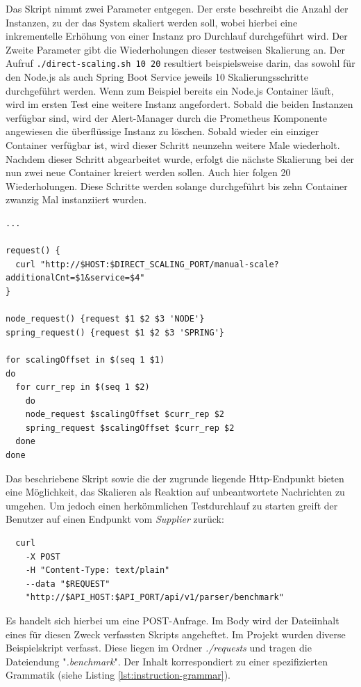 Das Skript nimmt zwei Parameter entgegen. Der erste beschreibt die Anzahl der Instanzen, zu der das System skaliert werden soll, wobei hierbei eine inkrementelle Erhöhung von einer Instanz pro Durchlauf durchgeführt wird. Der Zweite Parameter gibt die Wiederholungen dieser testweisen Skalierung an. Der Aufruf \verb+./direct-scaling.sh 10 20+ resultiert beispielsweise darin, das sowohl für den Node.js als auch Spring Boot Service jeweils 10 Skalierungsschritte durchgeführt werden. Wenn zum Beispiel bereits ein Node.js Container läuft, wird im ersten Test eine weitere Instanz angefordert. Sobald die beiden Instanzen verfügbar sind, wird der Alert-Manager durch die Prometheus Komponente angewiesen die überflüssige Instanz zu löschen. Sobald wieder ein einziger Container verfügbar ist, wird dieser Schritt neunzehn weitere Male wiederholt. Nachdem dieser Schritt abgearbeitet wurde, erfolgt die nächste Skalierung bei der nun zwei neue Container kreiert werden sollen. Auch hier folgen 20 Wiederholungen. Diese Schritte werden solange durchgeführt bis zehn Container zwanzig Mal instanziiert wurden. 

\label{lst:direct-scaling}
\begin{lstlisting}[caption={direct-scaling},style=bashStyle]
...

request() {
  curl "http://$HOST:$DIRECT_SCALING_PORT/manual-scale?additionalCnt=$1&service=$4"
}

node_request() {request $1 $2 $3 'NODE'}
spring_request() {request $1 $2 $3 'SPRING'}

for scalingOffset in $(seq 1 $1)
do 
  for curr_rep in $(seq 1 $2)
	do 
    node_request $scalingOffset $curr_rep $2
    spring_request $scalingOffset $curr_rep $2
  done
done
\end{lstlisting}

Das beschriebene Skript sowie die der zugrunde liegende Http-Endpunkt bieten eine Möglichkeit, das Skalieren als Reaktion auf unbeantwortete Nachrichten zu umgehen. Um jedoch einen herkömmlichen Testdurchlauf zu starten greift der Benutzer auf einen Endpunkt vom \emph{Supplier} zurück: 

\begin{verbatim}
  curl 
    -X POST 
    -H "Content-Type: text/plain" 
    --data "$REQUEST" 
    "http://$API_HOST:$API_PORT/api/v1/parser/benchmark"
\end{verbatim}

Es handelt sich hierbei um eine POST-Anfrage. Im Body wird der Dateiinhalt eines für diesen Zweck verfassten Skripts angeheftet. Im Projekt wurden diverse Beispielskript verfasst. Diese liegen im Ordner \emph{./requests} und tragen die Dateiendung "\emph{.benchmark}". Der Inhalt korrespondiert zu einer spezifizierten Grammatik (siehe Listing \ref{lst:instruction-grammar}).

